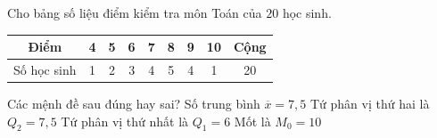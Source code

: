 \begin{ex}%
	Cho bảng số liệu điểm  kiểm tra môn Toán của $20$ học sinh.
	\begin{center}
		\begin{tabular}{|c|c|c|c|c|c|c|c|c|}
			\hline Điểm & 4 & 5 & 6 &  7 & 8 & 9 & 10 & Cộng \\
			\hline Số học sinh & 1 & 2 & 3 & 4 & 5 & 4 & 1 & 20 \\ 
			 \hline
		\end{tabular}
	\end{center}
	Các mệnh  đề sau đúng hay sai?
	 \choiceTF
		{Số  trung bình $\overline{x}=7{,}5$}
		{\True Tứ phân  vị thứ hai là $Q_2=7{,}5$}
		{\True Tứ  phân vị thứ nhất là $Q_1=6$}
		 {Mốt là $M_0=10$}
\end{ex}

